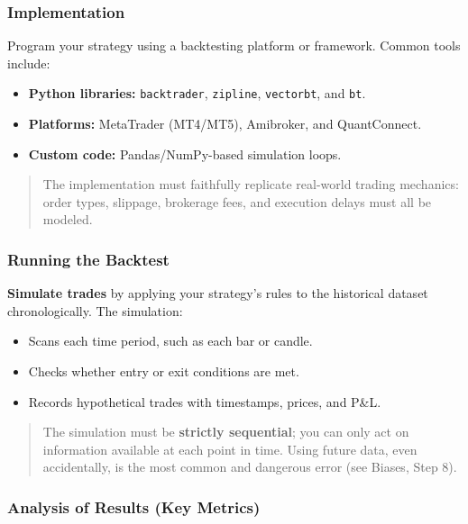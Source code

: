 \documentclass[12pt,openany]{book}
\begin{document}
\subsubsection{Implementation}

Program your strategy using a backtesting platform or framework. Common tools include:
\begin{itemize}[leftmargin=*]
    \item \textbf{Python libraries:} \texttt{backtrader}, \texttt{zipline}, \texttt{vectorbt}, and \texttt{bt}.
    \item \textbf{Platforms:} MetaTrader (MT4/MT5), Amibroker, and QuantConnect.
    \item \textbf{Custom code:} Pandas/NumPy-based simulation loops.
\end{itemize}

\begin{quote}
    The implementation must faithfully replicate real-world trading mechanics: order types, slippage, brokerage fees, and execution delays must all be modeled.
\end{quote}

\subsubsection{Running the Backtest}

\textbf{Simulate trades} by applying your strategy's rules to the historical dataset chronologically. The simulation:
\begin{itemize}[leftmargin=*]
    \item Scans each time period, such as each bar or candle.
    \item Checks whether entry or exit conditions are met.
    \item Records hypothetical trades with timestamps, prices, and P\&L.
\end{itemize}

\begin{quote}
    The simulation must be \textbf{strictly sequential}; you can only act on information available at each point in time. Using future data, even accidentally, is the most common and dangerous error (see Biases, Step 8).
\end{quote}

\subsubsection{Analysis of Results (Key Metrics)}
\end{document}

